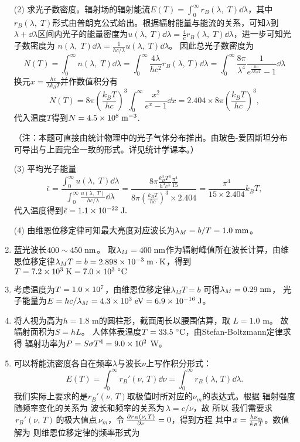 \begin{enumerate}[label=1.\arabic*, leftmargin=-0.5mm]
(2) 求光子数密度。辐射场的辐射能流$E(T)=\int_0^\infty r_B(\lambda,\;T )\dd{\lambda}$，其中$r_B(\lambda,\;T )$形式由普朗克公式给出。根据辐射能量与能流的关系，可知$\lambda$到$\lambda+\dd{\lambda}$区间内光子的能量密度为$u(\lambda,\;T)\dd{\lambda}= \frac 4c r_B(\lambda,\;T)\dd{\lambda}$，进一步可知光子数密度为
$n(\lambda,\;T)\dd{\lambda} = \frac{1}{hc/\lambda}u(\lambda,\;T)\dd{\lambda}$。
因此总光子数密度为
\[N(T)=\int_0^{\infty}n(\lambda,\;T)\dd{\lambda}=\int_0^{\infty}\frac{4\lambda}{hc^2}r_B(\lambda,\,T)\dd{\lambda} = \int_0^{\infty}\frac{8\pi}{\lambda^4}\frac{1}{e^{\frac{hc}{\lambda k_B T}}-1}\dd{\lambda}\]
换元$x=\frac{hc}{\lambda k_B T}$并作数值积分有
\[N(T)=8\pi \left(\frac{k_B T}{hc}\right)^3\int_0^\infty \frac{x^2}{e^x -1}\dd{x} = 2.404\times8\pi\left(\frac{k_B T}{hc}\right)^3,\]
代入温度$T$得到$N=4.5\times 10^{8}\;\mathrm{m^{-3}}$.

（注：本题可直接由统计物理中的光子气体分布推出。由玻色-爱因斯坦分布可导出与上面完全一致的形式。详见统计学课本。）

(3) 平均光子能量
\[\bar{\epsilon}=\frac{\int_0^{\infty}u(\lambda,\;T)\dd{\lambda}}{\int_0^{\infty}\frac{u(\lambda,\;T)}{hc/\lambda}\dd{\lambda}}=\frac{8\pi\frac{k_B^4 T^4}{h^3 c^3}\frac{\pi^4}{15}}{8\pi\left(\frac{k_B T}{hc}\right)^3\times 2.404} = \frac{\pi^4}{15\times2.404}k_B T,\]
代入温度得到$\bar\epsilon = 1.1\times 10^{-22}\;\mathrm{J}.$

(4) 由维恩位移定律可知最大亮度对应波长为$\lambda_M = b/T= 1.0\;\mathrm{mm}$。


\item
蓝光波长$400\sim 450 \;\mathrm{nm}$。
取$\lambda_M=400\;\mathrm{nm}$作为辐射峰值所在波长计算，由维恩位移定律$\lambda_M T=b=2.898\times 10^{-3}\;\mathrm{m\cdot K}$，得到$T=7.2\times 10^{3}\;\mathrm{K}=7.0\times 10^{3}\;^\circ \mathrm{C}$

\item
考虑温度为$T = 1.0\times 10^{7}$，由维恩位移定律$\lambda_M T=b$
可得$\lambda_M = 0.29\;\mathrm{nm}$，
光子能量为$E=hc/\lambda_M=4.3\times 10^{3}\;\mathrm{eV}=6.9\times 10^{-16}\;\mathrm{J}$。

\item
将人视为高为$h=1.8$ m的圆柱形，截面周长以腰围估算，取
$L=1.0$ m。
故辐射面积为$S=hL$。
人体体表温度$T = 33.5\;^\circ \mathrm{C}$，由Stefan-Boltzmann定律求得
辐射功率为$P=S\sigma T^4= 9.0\times 10^{2}$ W。

\item
可以将能流密度各自在频率$\lambda$与波长$\nu$上写作积分形式：
\[E(T) = \int_0^{\infty}r_B'(\nu,\,T)\dd{\nu} = \int_0^{\infty}r_B(\lambda,\,T)\dd{\lambda}. \]
我们实际上要求的是$r_B'(\nu,\,T)$取极值时所对应的$\nu_m$的表达式。根据
辐射强度随频率变化的关系为
波长和频率的关系为$\,\lambda=c/\nu$，故
所以
我们需要求$\,r_B'(\nu,\,T)\,$的极大值点$\,\nu_m$，令$\,\frac{\partial r_B(\nu,\,T)}{\partial\nu}=0$，得到方程
其中$\,x=\frac{h\nu_m}{k_B T}$。数值解为
则维恩位移定律的频率形式为


\end{enumerate}
